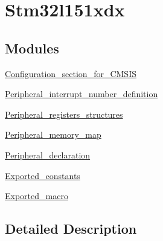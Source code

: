 \hypertarget{group__stm32l151xdx}{\section{Stm32l151xdx}
\label{group__stm32l151xdx}
}
\subsection*{Modules}
\begin{DoxyCompactItemize}
\item 
\hyperlink{group___configuration__section__for___c_m_s_i_s}{Configuration\-\_\-section\-\_\-for\-\_\-\-C\-M\-S\-I\-S}
\item 
\hyperlink{group___peripheral__interrupt__number__definition}{Peripheral\-\_\-interrupt\-\_\-number\-\_\-definition}
\item 
\hyperlink{group___peripheral__registers__structures}{Peripheral\-\_\-registers\-\_\-structures}
\item 
\hyperlink{group___peripheral__memory__map}{Peripheral\-\_\-memory\-\_\-map}
\item 
\hyperlink{group___peripheral__declaration}{Peripheral\-\_\-declaration}
\item 
\hyperlink{group___exported__constants}{Exported\-\_\-constants}
\item 
\hyperlink{group___exported__macro}{Exported\-\_\-macro}
\end{DoxyCompactItemize}


\subsection{Detailed Description}
